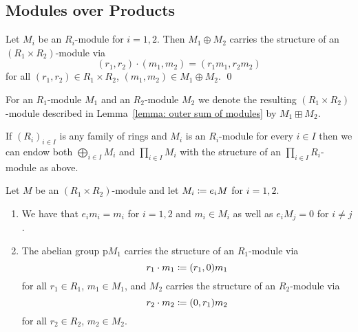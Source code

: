 \subsection{Modules over Products}


\begin{lemma}
  \label{lemma: outer sum of modules}
  Let $M_i$ be an $R_i$-module for $i = 1, 2$.
  Then $M_1 \oplus M_2$ carries the structure of an $(R_1 \times R_2)$-module via
  \[
      (r_1, r_2) \cdot (m_1, m_2)
    = (r_1 m_1, r_2 m_2)
  \]
  for all $(r_1, r_2) \in R_1 \times R_2$, $(m_1, m_2) \in M_1 \oplus M_2$.
  \qed
\end{lemma}


\begin{definition}
  For an $R_1$-module $M_1$ and an $R_2$-module $M_2$ we denote the resulting $(R_1 \times R_2)$-module described in Lemma~\ref{lemma: outer sum of modules} by $M_1 \boxplus M_2$.
\end{definition}


\begin{remark}
  If $(R_i)_{i \in I}$ is any family of rings and $M_i$ is an $R_i$-module for every $i \in I$ then we can endow both $\bigoplus_{i \in I} M_i$ and $\prod_{i \in I} M_i$ with the structure of an $\prod_{i \in I} R_i$-module as above.
\end{remark}


\begin{lemma}
  \label{lemma: restriction of modules}
  Let $M$ be an $(R_1 \times R_2)$-module and let $M_i \coloneqq e_i M$ for $i = 1, 2$.
  \begin{enumerate}
    \item
      \label{enumerate: mi absorbs ei}
      We have that $e_i m_i = m_i$ for $i = 1, 2$ and $m_i \in M_i$ as well as $e_i M_j = 0$ for $i \neq j$.
    \item
      The abelian group p$M_1$ carries the structure of an $R_1$-module via
      \[
                  r_1 \cdot m_1
        \coloneqq  (r_1, 0) m_1
      \]
      for all $r_1 \in R_1$, $m_1 \in M_1$, and $M_2$ carries the structure of an $R_2$-module via
      \[
                  r_2 \cdot m_2
        \coloneqq  (0, r_1) m_2
      \]
      for all $r_2 \in R_2$, $m_2 \in M_2$.
  \end{enumerate}
\end{lemma}


